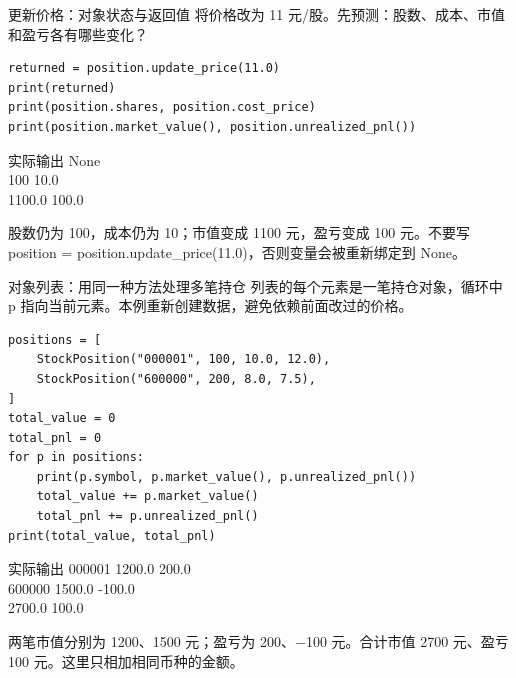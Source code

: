 \documentclass[9pt]{ctexbeamer}
\begin{document}
\begin{frame}[fragile]{更新价格：对象状态与返回值}
将价格改为 11 元/股。先预测：股数、成本、市值和盈亏各有哪些变化？
\begin{lstlisting}
returned = position.update_price(11.0)
print(returned)
print(position.shares, position.cost_price)
print(position.market_value(), position.unrealized_pnl())
\end{lstlisting}
\begin{exampleblock}{实际输出}
{\ttfamily\small None\\
100 10.0\\
1100.0 100.0}
\end{exampleblock}
\small 股数仍为 100，成本仍为 10；市值变成 1100 元，盈亏变成 100 元。不要写 position = position.update\_price(11.0)，否则变量会被重新绑定到 None。
\par{}

\end{frame}

\begin{frame}[fragile]{对象列表：用同一种方法处理多笔持仓}
列表的每个元素是一笔持仓对象，循环中 p 指向当前元素。本例重新创建数据，避免依赖前面改过的价格。
\begin{lstlisting}
positions = [
    StockPosition("000001", 100, 10.0, 12.0),
    StockPosition("600000", 200, 8.0, 7.5),
]
total_value = 0
total_pnl = 0
for p in positions:
    print(p.symbol, p.market_value(), p.unrealized_pnl())
    total_value += p.market_value()
    total_pnl += p.unrealized_pnl()
print(total_value, total_pnl)
\end{lstlisting}
\begin{exampleblock}{实际输出}
{\ttfamily\small 000001 1200.0 200.0\\
600000 1500.0 -100.0\\
2700.0 100.0}
\end{exampleblock}
\small 两笔市值分别为 1200、1500 元；盈亏为 200、−100 元。合计市值 2700 元、盈亏 100 元。这里只相加相同币种的金额。
\par{}

\end{frame}
\end{document}
